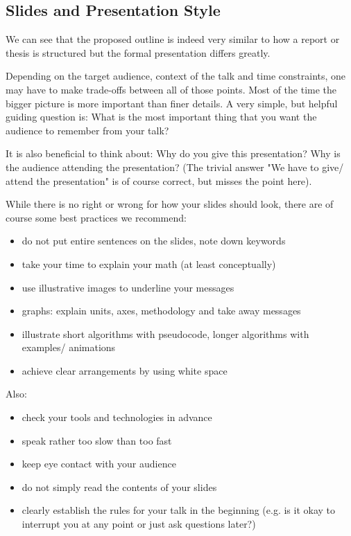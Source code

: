 \documentclass[twocolumn]{mlai-guide}
\begin{document}
\subsection{Slides and Presentation Style}

We can see that the proposed outline is indeed very similar to how a report or thesis is structured but the formal presentation differs greatly. 

Depending on the target audience, context of the talk and time constraints, one may have to make trade-offs between all of those points. Most of the time the bigger picture is more important than finer details. A very simple, but helpful guiding question is: What is the most important thing that you want the audience to remember from your talk?

It is also beneficial to think about: Why do you give this presentation? Why is the audience attending the presentation? (The trivial answer "We have to give/ attend the presentation" is of course correct, but misses the point here). %

While there is no right or wrong for how your slides should look, there are of course some best practices we recommend:

\begin{itemize}
    \item do not put entire sentences on the slides, note down keywords
    \item take your time to explain your math (at least conceptually)
    \item use illustrative images to underline your messages
    \item graphs: explain units, axes, methodology and take away messages
    \item illustrate short algorithms with pseudocode, longer algorithms with examples/ animations
    \item achieve clear arrangements by using white space
\end{itemize}

Also: 
\begin{itemize}
    \item check your tools and technologies in advance
    \item speak rather too slow than too fast
    \item keep eye contact with your audience
    \item do not simply read the contents of your slides
    \item clearly establish the rules for your talk in the beginning (e.g. is it okay to interrupt you at any point or just ask questions later?)
\end{itemize}
\end{document}
